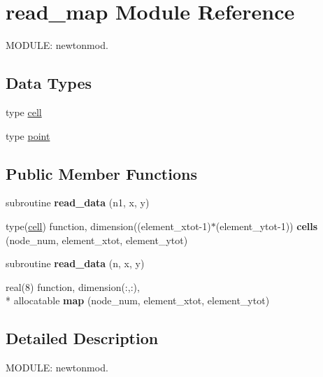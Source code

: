 \hypertarget{classread__map}{\section{read\-\_\-map Module Reference}
\label{classread__map}
}


M\-O\-D\-U\-L\-E\-: newtonmod.  


\subsection*{Data Types}
\begin{DoxyCompactItemize}
\item 
type \hyperlink{structread__map_1_1cell}{cell}
\item 
type \hyperlink{structread__map_1_1point}{point}
\end{DoxyCompactItemize}
\subsection*{Public Member Functions}
\begin{DoxyCompactItemize}
\item 
\hypertarget{classread__map_aefa989079b26f2b33f02fa7abdbbd12a}{subroutine {\bfseries read\-\_\-data} (n1, x, y)}\label{classread__map_aefa989079b26f2b33f02fa7abdbbd12a}

\item 
\hypertarget{classread__map_a105fe759da4c6b26baa8c234b6edad3d}{type(\hyperlink{structread__map_1_1cell}{cell}) function, dimension((element\-\_\-xtot-\/1)$\ast$(element\-\_\-ytot-\/1)) {\bfseries cells} (node\-\_\-num, element\-\_\-xtot, element\-\_\-ytot)}\label{classread__map_a105fe759da4c6b26baa8c234b6edad3d}

\item 
\hypertarget{classread__map_a280dfcf69c0ebfa3b088574dd6edf2ea}{subroutine {\bfseries read\-\_\-data} (n, x, y)}\label{classread__map_a280dfcf69c0ebfa3b088574dd6edf2ea}

\item 
\hypertarget{classread__map_a8082c06ab88bca2b89867d3b80208179}{real(8) function, dimension(\-:,\-:), \\*
allocatable {\bfseries map} (node\-\_\-num, element\-\_\-xtot, element\-\_\-ytot)}\label{classread__map_a8082c06ab88bca2b89867d3b80208179}

\end{DoxyCompactItemize}


\subsection{Detailed Description}
M\-O\-D\-U\-L\-E\-: newtonmod. 


